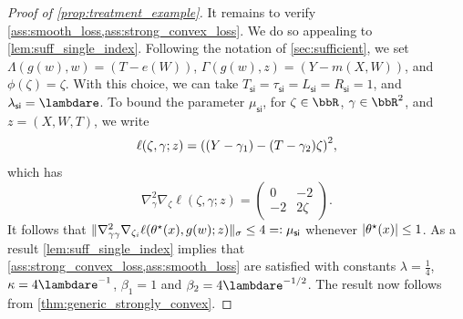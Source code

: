 \documentclass[11pt]{article} %
\newcommand{\pref}[1]{\cref{#1}}
\newcommand{\pfref}[1]{Proof of \pref{#1}}
\theoremstyle{theorem}  %
\theoremstyle{plain}
\DeclarePairedDelimiter{\abs}{\lvert}{\rvert} %
\DeclarePairedDelimiter{\prn}{(}{)}
\DeclarePairedDelimiter{\nrm}{\|}{\|}
\newcommand{\ls}{\ell}
\newcommand{\rdef}{=\vcentcolon}
\newcommand{\grad}{\nabla}
\newcommand{\varone}{w} %
\newcommand{\vartwo}{x} %
\newcommand{\besttwo}{\theta^{\star}}
\newcommand{\si}{\mathsf{si}}
\newcommand{\Lsi}{L_{\si}}
\newcommand{\Rsi}{R_{\si}}
\newcommand{\Tsi}{T_{\si}}
\newcommand{\tausi}{\tau_{\si}}
\newcommand{\musi}{\mu_{\si}}
\newcommand{\gammasi}{\lambda_{\si}}
\begin{document}
\begin{proof}[\pfref{prop:treatment_example}]
It remains to verify \pref{ass:smooth_loss,ass:strong_convex_loss}. We do so appealing to \pref{lem:suff_single_index}. Following the notation of \pref{sec:sufficient}, we set $\Lambda(g(w),w)=(T-e(W))$, $\Gamma(g(w),z) = (Y-m(X,W))$, and $\phi(\zeta)=\zeta$. With this choice, we can take $\Tsi=\tausi=\Lsi=\Rsi=1$, and $\gammasi=\lambdare$. To bound the parameter $\musi$, for $\zeta\in\bbR$, $\gamma\in\bbR^2$, and $z=(X,W,T)$, we write
  \[
    \ls(\zeta,\gamma;z) = \prn*{(Y-\gamma_1) - (T-\gamma_2)\zeta}^2,
  \]
  which has
  \[
    \grad^2_{\gamma}\grad_{\zeta}\ls(\zeta,\gamma;z) = \left(
      \begin{array}{lr}
        0 & -2\\
        -2 & 2\zeta
      \end{array}
      \right).
    \]
    It follows that $\nrm{\nabla_{\gamma\gamma}^2 \nabla_{\zeta_i} \ell(\besttwo(\vartwo), g(\varone);z)}_{\sigma}\leq{}4\rdef\musi$ whenever $\abs{\besttwo(x)}\leq{}1$. As a result \pref{lem:suff_single_index} implies that \pref{ass:strong_convex_loss,ass:smooth_loss} are satisfied with constants $\lambda = \frac{1}{4}$,  $\kappa=4\lambdare^{-1}$, $\beta_1=1$ and $\beta_2= 4\lambdare^{-1/2}$. The result now follows from \pref{thm:generic_strongly_convex}.
    
\end{proof}

%
%


%
\end{document}
